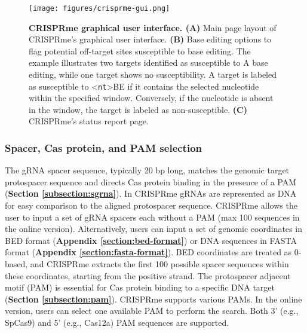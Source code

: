 \documentclass[a4paper, titlepage, openright]{book}
\newcommand{\crisprme}{CRISPRme\xspace}
\begin{document}
\begin{figure}[!]
    \centering
    \texttt{[image: figures/crisprme-gui.png]}
    \caption[\crisprme graphical user interface]{\textbf{\crisprme graphical user interface. (A)} Main page layout of \crisprme's graphical user interface. \textbf{(B)} Base editing options to flag potential off-target sites susceptible to base editing. The example illustrates two targets identified as susceptible to A base editing, while one target shows no susceptibility. A target is labeled as susceptible to <\texttt{nt}>BE if it contains the selected nucleotide within the specified window. Conversely, if the nucleotide is absent in the window, the target is labeled as non-susceptible. \textbf{(C)} \crisprme's status report page.}
    \label{fig:crisprme-gui}
\end{figure}

\subsubsection{Spacer, Cas protein, and PAM selection}
The gRNA spacer sequence, typically 20 bp long, matches the genomic target protospacer sequence and directs Cas protein binding in the presence of a PAM (\textbf{Section \ref{subsection:sgrna}}). In \crisprme gRNAs are represented as DNA for easy comparison to the aligned protospacer sequence. \crisprme allows the user to input a set of gRNA spacers each without a PAM (max 100 sequences in the online version). Alternatively, users can input a set of genomic coordinates in BED format (\textbf{Appendix \ref{section:bed-format}}) or DNA sequences in FASTA format (\textbf{Appendix \ref{section:fasta-format}}). BED coordinates are treated as 0-based, and \crisprme extracts the first 100 possible spacer sequences within these coordinates, starting from the positive strand. The protospacer adjacent motif (PAM) is essential for Cas protein binding to a specific DNA target (\textbf{Section \ref{subsection:pam}}). \crisprme supports various PAMs. In the online version, users can select one available PAM to perform the search. Both 3’ (e.g., SpCas9) and 5’ (e.g., Cas12a) PAM sequences are supported.

\end{document}
